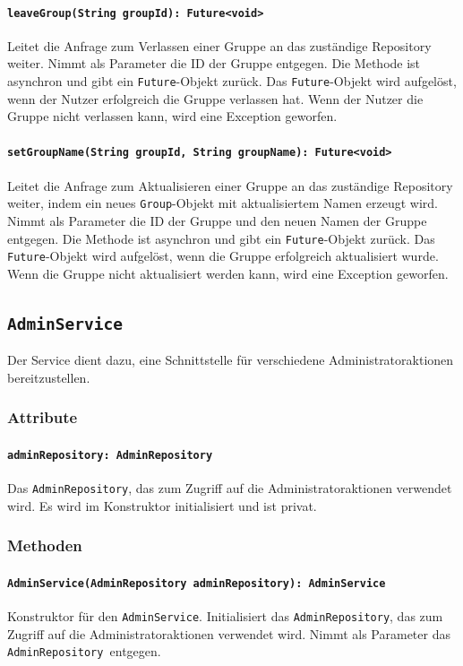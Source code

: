 \documentclass[parskip=full]{scrartcl}
\begin{document}
\paragraph{\texttt{leaveGroup(String groupId): Future<void>}}
Leitet die Anfrage zum Verlassen einer Gruppe an das zuständige Repository weiter. Nimmt als Parameter die ID der Gruppe entgegen. Die Methode ist asynchron und gibt ein \texttt{Future}-Objekt zurück. Das \texttt{Future}-Objekt wird aufgelöst, wenn der Nutzer erfolgreich die Gruppe verlassen hat. Wenn der Nutzer die Gruppe nicht verlassen kann, wird eine Exception geworfen.
\paragraph{\texttt{setGroupName(String groupId, String groupName): Future<void>}}
Leitet die Anfrage zum Aktualisieren einer Gruppe an das zuständige Repository weiter, indem ein neues \texttt{Group}-Objekt mit aktualisiertem Namen erzeugt wird. Nimmt als Parameter die ID der Gruppe und den neuen Namen der Gruppe entgegen. Die Methode ist asynchron und gibt ein \texttt{Future}-Objekt zurück. Das \texttt{Future}-Objekt wird aufgelöst, wenn die Gruppe erfolgreich aktualisiert wurde. Wenn die Gruppe nicht aktualisiert werden kann, wird eine Exception geworfen.

\newpage
\subsection{\texttt{AdminService}}
Der Service dient dazu, eine Schnittstelle für verschiedene Administratoraktionen bereitzustellen.
\subsubsection*{Attribute}
\paragraph{\texttt{adminRepository: AdminRepository}}
Das \texttt{AdminRepository}, das zum Zugriff auf die Administratoraktionen verwendet wird. Es wird im Konstruktor initialisiert und ist privat.
\subsubsection*{Methoden}
\paragraph{\texttt{AdminService(AdminRepository adminRepository): AdminService}}
Konstruktor für den \texttt{AdminService}. Initialisiert das \texttt{AdminRepository}, das zum Zugriff auf die Administratoraktionen verwendet wird. Nimmt als Parameter das \texttt{AdminRepository }entgegen.
\end{document}
